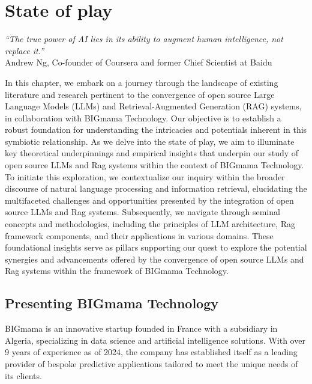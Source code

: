 \chapter{State of play}
\graphicspath{{state-of-play/figures/}}

\begin{flushright}
    \small{\textit{``The true power of AI lies in its ability to augment human intelligence, not replace it.''}\\
        Andrew Ng, Co-founder of Coursera and former Chief Scientist at Baidu}
\end{flushright}

In this chapter, we embark on a journey through the landscape of existing literature and research pertinent to the convergence of open source Large Language Models (LLMs) and Retrieval-Augmented Generation (RAG) systems, in collaboration with BIGmama Technology. Our objective is to establish a robust foundation for understanding the intricacies and potentials inherent in this symbiotic relationship. As we delve into the state of play, we aim to illuminate key theoretical underpinnings and empirical insights that underpin our study of open source LLMs and Rag systems within the context of BIGmama Technology. To initiate this exploration, we contextualize our inquiry within the broader discourse of natural language processing and information retrieval, elucidating the multifaceted challenges and opportunities presented by the integration of open source LLMs and Rag systems. Subsequently, we navigate through seminal concepts and methodologies, including the principles of LLM architecture, Rag framework components, and their applications in various domains. These foundational insights serve as pillars supporting our quest to explore the potential synergies and advancements offered by the convergence of open source LLMs and Rag systems within the framework of BIGmama Technology.

\section{Presenting BIGmama Technology}

BIGmama is an innovative startup founded in France with a subsidiary in Algeria, specializing in data science and artificial intelligence solutions. With over 9 years of experience as of 2024, the company has established itself as a leading provider of bespoke predictive applications tailored to meet the unique needs of its clients.

